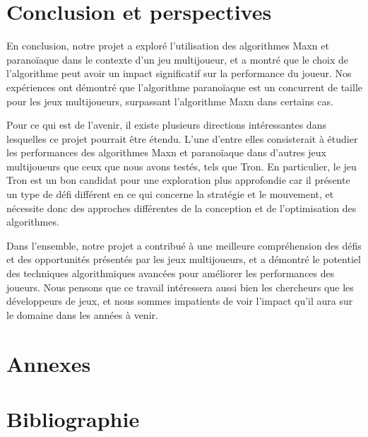 \documentclass[a4paper,12pt]{article}
\begin{document}
\section*{Conclusion et perspectives}
En conclusion, notre projet a exploré l'utilisation des algorithmes Maxn et paranoïaque dans le contexte d'un jeu multijoueur, et a montré que le choix de l'algorithme peut avoir un impact significatif sur la performance du joueur. Nos expériences ont démontré que l'algorithme paranoïaque est un concurrent de taille pour les jeux multijoueurs, surpassant l'algorithme Maxn dans certains cas.

Pour ce qui est de l'avenir, il existe plusieurs directions intéressantes dans lesquelles ce projet pourrait être étendu. L'une d'entre elles consisterait à étudier les performances des algorithmes Maxn et paranoïaque dans d'autres jeux multijoueurs que ceux que nous avons testés, tels que Tron. En particulier, le jeu Tron est un bon candidat pour une exploration plus approfondie car il présente un type de défi différent en ce qui concerne la stratégie et le mouvement, et nécessite donc des approches différentes de la conception et de l'optimisation des algorithmes.

Dans l'ensemble, notre projet a contribué à une meilleure compréhension des défis et des opportunités présentés par les jeux multijoueurs, et a démontré le potentiel des techniques algorithmiques avancées pour améliorer les performances des joueurs. Nous pensons que ce travail intéressera aussi bien les chercheurs que les développeurs de jeux, et nous sommes impatients de voir l'impact qu'il aura sur le domaine dans les années à venir.

\newpage
{}
\section*{Annexes}
\renewcommand{\thesection}{\Alph{section}}
\setcounter{section}{0}





\thispagestyle{empty}
\listoffigures

\listoftables

\listofalgorithms

\section*{Bibliographie}
\nocite{*}


\end{document}
